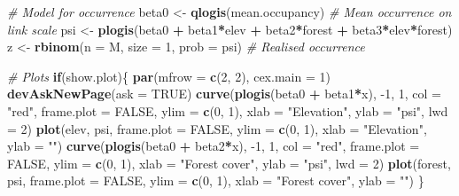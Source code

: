 \documentclass[
]{book}
\newenvironment{Shaded}{\begin{snugshade}}{\end{snugshade}}
\newcommand{\CommentTok}[1]{\textcolor[rgb]{0.56,0.35,0.01}{\textit{#1}}}
\newcommand{\ControlFlowTok}[1]{\textcolor[rgb]{0.13,0.29,0.53}{\textbf{#1}}}
\newcommand{\DataTypeTok}[1]{\textcolor[rgb]{0.13,0.29,0.53}{#1}}
\newcommand{\DecValTok}[1]{\textcolor[rgb]{0.00,0.00,0.81}{#1}}
\newcommand{\KeywordTok}[1]{\textcolor[rgb]{0.13,0.29,0.53}{\textbf{#1}}}
\newcommand{\NormalTok}[1]{#1}
\newcommand{\OperatorTok}[1]{\textcolor[rgb]{0.81,0.36,0.00}{\textbf{#1}}}
\newcommand{\OtherTok}[1]{\textcolor[rgb]{0.56,0.35,0.01}{#1}}
\newcommand{\StringTok}[1]{\textcolor[rgb]{0.31,0.60,0.02}{#1}}
\begin{document}
\begin{Shaded}
\begin{Highlighting}[]
\CommentTok{# Model for occurrence}
\NormalTok{beta0 <-}\StringTok{ }\KeywordTok{qlogis}\NormalTok{(mean.occupancy)               }\CommentTok{# Mean occurrence on link scale}
\NormalTok{psi <-}\StringTok{ }\KeywordTok{plogis}\NormalTok{(beta0 }\OperatorTok{+}\StringTok{ }\NormalTok{beta1}\OperatorTok{*}\NormalTok{elev }\OperatorTok{+}\StringTok{ }\NormalTok{beta2}\OperatorTok{*}\NormalTok{forest }\OperatorTok{+}\StringTok{ }\NormalTok{beta3}\OperatorTok{*}\NormalTok{elev}\OperatorTok{*}\NormalTok{forest)}
\NormalTok{z <-}\StringTok{ }\KeywordTok{rbinom}\NormalTok{(}\DataTypeTok{n =}\NormalTok{ M, }\DataTypeTok{size =} \DecValTok{1}\NormalTok{, }\DataTypeTok{prob =}\NormalTok{ psi)      }\CommentTok{# Realised occurrence}

\CommentTok{# Plots}
\ControlFlowTok{if}\NormalTok{(show.plot)\{}
  \KeywordTok{par}\NormalTok{(}\DataTypeTok{mfrow =} \KeywordTok{c}\NormalTok{(}\DecValTok{2}\NormalTok{, }\DecValTok{2}\NormalTok{), }\DataTypeTok{cex.main =} \DecValTok{1}\NormalTok{)}
  \KeywordTok{devAskNewPage}\NormalTok{(}\DataTypeTok{ask =} \OtherTok{TRUE}\NormalTok{)}
  \KeywordTok{curve}\NormalTok{(}\KeywordTok{plogis}\NormalTok{(beta0 }\OperatorTok{+}\StringTok{ }\NormalTok{beta1}\OperatorTok{*}\NormalTok{x), }\DecValTok{-1}\NormalTok{, }\DecValTok{1}\NormalTok{, }\DataTypeTok{col =} \StringTok{"red"}\NormalTok{, }\DataTypeTok{frame.plot =} \OtherTok{FALSE}\NormalTok{, }
      \DataTypeTok{ylim =} \KeywordTok{c}\NormalTok{(}\DecValTok{0}\NormalTok{, }\DecValTok{1}\NormalTok{), }\DataTypeTok{xlab =} \StringTok{"Elevation"}\NormalTok{, }\DataTypeTok{ylab =} \StringTok{"psi"}\NormalTok{, }\DataTypeTok{lwd =} \DecValTok{2}\NormalTok{)}
  \KeywordTok{plot}\NormalTok{(elev, psi, }\DataTypeTok{frame.plot =} \OtherTok{FALSE}\NormalTok{, }\DataTypeTok{ylim =} \KeywordTok{c}\NormalTok{(}\DecValTok{0}\NormalTok{, }\DecValTok{1}\NormalTok{), }\DataTypeTok{xlab =} \StringTok{"Elevation"}\NormalTok{, }
     \DataTypeTok{ylab =} \StringTok{""}\NormalTok{)}
  \KeywordTok{curve}\NormalTok{(}\KeywordTok{plogis}\NormalTok{(beta0 }\OperatorTok{+}\StringTok{ }\NormalTok{beta2}\OperatorTok{*}\NormalTok{x), }\DecValTok{-1}\NormalTok{, }\DecValTok{1}\NormalTok{, }\DataTypeTok{col =} \StringTok{"red"}\NormalTok{, }\DataTypeTok{frame.plot =} \OtherTok{FALSE}\NormalTok{, }
      \DataTypeTok{ylim =} \KeywordTok{c}\NormalTok{(}\DecValTok{0}\NormalTok{, }\DecValTok{1}\NormalTok{), }\DataTypeTok{xlab =} \StringTok{"Forest cover"}\NormalTok{, }\DataTypeTok{ylab =} \StringTok{"psi"}\NormalTok{, }\DataTypeTok{lwd =} \DecValTok{2}\NormalTok{)}
  \KeywordTok{plot}\NormalTok{(forest, psi, }\DataTypeTok{frame.plot =} \OtherTok{FALSE}\NormalTok{, }\DataTypeTok{ylim =} \KeywordTok{c}\NormalTok{(}\DecValTok{0}\NormalTok{, }\DecValTok{1}\NormalTok{), }\DataTypeTok{xlab =} \StringTok{"Forest cover"}\NormalTok{, }
     \DataTypeTok{ylab =} \StringTok{""}\NormalTok{)}
\NormalTok{\}}


\end{Highlighting}
\end{Shaded}
\end{document}
